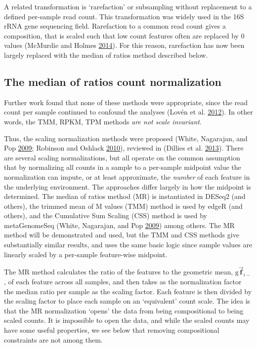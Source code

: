 \documentclass[onecolumn]{book}
\newcommand{\vect}[1]{\vec{\textbf{#1}}}
\theoremstyle{definition}
\theoremstyle{definition}
\theoremstyle{definition}
\theoremstyle{remark}
\begin{document}
A related transformation is `rarefaction' or subsampling without
replacement to a defined per-sample read count. This transformation was
widely used in the 16S rRNA gene sequencing field. Rarefaction to a
common read count gives a composition, that is scaled such that low
count features often are replaced by 0 values (McMurdie and Holmes
\protect\hyperlink{ref-McMurdie:2014a}{2014}). For this reason,
rarefaction has now been largely replaced with the median of ratios
method described below.

\hypertarget{the-median-of-ratios-count-normalization}{%
\subsection{The median of ratios count
normalization}\label{the-median-of-ratios-count-normalization}}

Further work found that none of these methods were appropriate, since
the read count per sample continued to confound the analyses (Lovén et
al. \protect\hyperlink{ref-Loven:2012aa}{2012}). In other words, the
TMM, RPKM, TPM methods \emph{are not scale invariant}.

Thus, the scaling normalization methods were proposed (White, Nagarajan,
and Pop \protect\hyperlink{ref-White:2009}{2009}; Robinson and Oshlack
\protect\hyperlink{ref-Robinson:2010a}{2010}), reviewed in (Dillies et
al. \protect\hyperlink{ref-Dillies:2013}{2013}). There are several
scaling normalizations, but all operate on the common assumption that by
normalizing all counts in a sample to a per-sample midpoint value the
normalization can impute, or at least approximate, the \emph{number} of
each feature in the underlying environment. The approaches differ
largely in how the midpoint is determined. The median of ratios method
(MR) is instantiated in DESeq2 (and others), the trimmed mean of M
values (TMM) method is used by edgeR (and others), and the Cumulative
Sum Scaling (CSS) method is used by metaGenomeSeq (White, Nagarajan, and
Pop \protect\hyperlink{ref-White:2009}{2009}) among others. The MR
method will be demonstrated and used, but the TMM and CSS methods give
substantially similar results, and uses the same basic logic since
sample values are linearly scaled by a per-sample feature-wise midpoint.

The MR method calculates the ratio of the features to the geometric
mean, \(\mathrm{g}\vect{f}_{i-}\), of each feature across all samples,
and then takes as the normalization factor the median ratio per sample
as the scaling factor. Each feature is then divided by the scaling
factor to place each sample on an `equivalent' count scale. The idea is
that the MR normalization `opens' the data from being compositional to
being scaled counts. It is impossible to open the data, and while the
scaled counts may have some useful properties, we see below that
removing compositional constraints are not among them.
\end{document}

